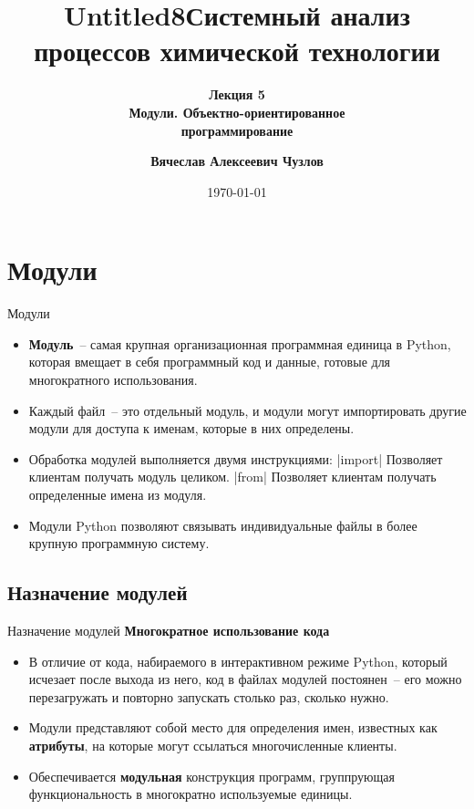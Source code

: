 \documentclass[aspectratio=169, mathserif]{beamer}	%
\title{Untitled8}
\title{\LARGE{Системный анализ процессов химической технологии}}
\subtitle{\textcolor{tpugreen}{\textbf{Лекция 5}} \\ \textbf{Модули. Объектно-ориентированное \\ программирование}}
\author[]{\textbf{Вячеслав Алексеевич Чузлов}}
\institute{к.т.н., доцент ОХИ ИШПР}
\date{\today}
\begin{document}

\titleframe		%

\tocframe{}		%


\section{Модули}
\sectionframe

\begin{frame}[fragile]{Модули}
\scriptsize
\begin{itemize}
	\item \textcolor{extraorange}{\textbf{Модуль}}~-- самая крупная организационная программная единица в Python, которая вмещает в себя программный код и данные, готовые для многократного использования.
	\item Каждый файл~-- это отдельный модуль, и модули могут импортировать другие модули для доступа к именам, которые в них определены.
	\item Обработка модулей выполняется двумя инструкциями:
	\vfill
	|import|
	\qquad Позволяет клиентам получать модуль целиком.
	\vfill
	|from|
	\qquad Позволяет клиентам получать определенные имена из модуля.
	\vfill
	\item Модули Python позволяют связывать индивидуальные файлы в более крупную программную систему.
\end{itemize}
\vfill
\end{frame}

\subsection{Назначение модулей}

\begin{frame}[fragile]{Назначение модулей}
\scriptsize
\textcolor{tpugreen}{\textbf{Многократное использование кода}}
\vfill
\begin{itemize}
	\item В отличие от кода, набираемого в интерактивном режиме Python, который исчезает после выхода из него, код в файлах модулей постоянен~-- его можно перезагружать и повторно запускать столько раз, сколько нужно.
	\vfill
	\item Модули представляют собой место для определения имен, известных как \textcolor{extraorange}{\textbf{атрибуты}}, на которые могут ссылаться многочисленные клиенты.
	\vfill
	\item Обеспечивается \textcolor{extraorange}{\textbf{модульная}} конструкция программ, группрующая функциональность в многократно используемые единицы.
\end{itemize}
\vfill
\end{frame}
\end{document}
